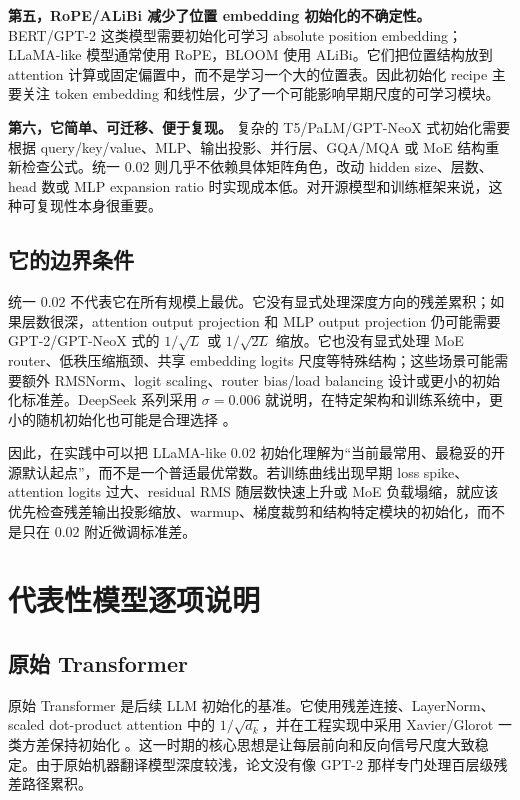 \documentclass[UTF8,a4paper,11pt]{ctexart}
\begin{document}
\textbf{第五，RoPE/ALiBi 减少了位置 embedding 初始化的不确定性。} BERT/GPT-2 这类模型需要初始化可学习 absolute position embedding；LLaMA-like 模型通常使用 RoPE，BLOOM 使用 ALiBi。它们把位置结构放到 attention 计算或固定偏置中，而不是学习一个大的位置表。因此初始化 recipe 主要关注 token embedding 和线性层，少了一个可能影响早期尺度的可学习模块。

\textbf{第六，它简单、可迁移、便于复现。} 复杂的 T5/PaLM/GPT-NeoX 式初始化需要根据 query/key/value、MLP、输出投影、并行层、GQA/MQA 或 MoE 结构重新检查公式。统一 $0.02$ 则几乎不依赖具体矩阵角色，改动 hidden size、层数、head 数或 MLP expansion ratio 时实现成本低。对开源模型和训练框架来说，这种可复现性本身很重要。

\subsection{它的边界条件}

统一 $0.02$ 不代表它在所有规模上最优。它没有显式处理深度方向的残差累积；如果层数很深，attention output projection 和 MLP output projection 仍可能需要 GPT-2/GPT-NeoX 式的 $1/\sqrt{L}$ 或 $1/\sqrt{2L}$ 缩放。它也没有显式处理 MoE router、低秩压缩瓶颈、共享 embedding logits 尺度等特殊结构；这些场景可能需要额外 RMSNorm、logit scaling、router bias/load balancing 设计或更小的初始化标准差。DeepSeek 系列采用 $\sigma=0.006$ 就说明，在特定架构和训练系统中，更小的随机初始化也可能是合理选择 \cite{deepseekllm,deepseekv2paper,deepseekv3paper}。

因此，在实践中可以把 LLaMA-like $0.02$ 初始化理解为“当前最常用、最稳妥的开源默认起点”，而不是一个普适最优常数。若训练曲线出现早期 loss spike、attention logits 过大、residual RMS 随层数快速上升或 MoE 负载塌缩，就应该优先检查残差输出投影缩放、warmup、梯度裁剪和结构特定模块的初始化，而不是只在 $0.02$ 附近微调标准差。


\section{代表性模型逐项说明}

\subsection{原始 Transformer}

原始 Transformer 是后续 LLM 初始化的基准。它使用残差连接、LayerNorm、scaled dot-product attention 中的 $1/\sqrt{d_k}$，并在工程实现中采用 Xavier/Glorot 一类方差保持初始化 \cite{transformer}。这一时期的核心思想是让每层前向和反向信号尺度大致稳定。由于原始机器翻译模型深度较浅，论文没有像 GPT-2 那样专门处理百层级残差路径累积。
\end{document}
